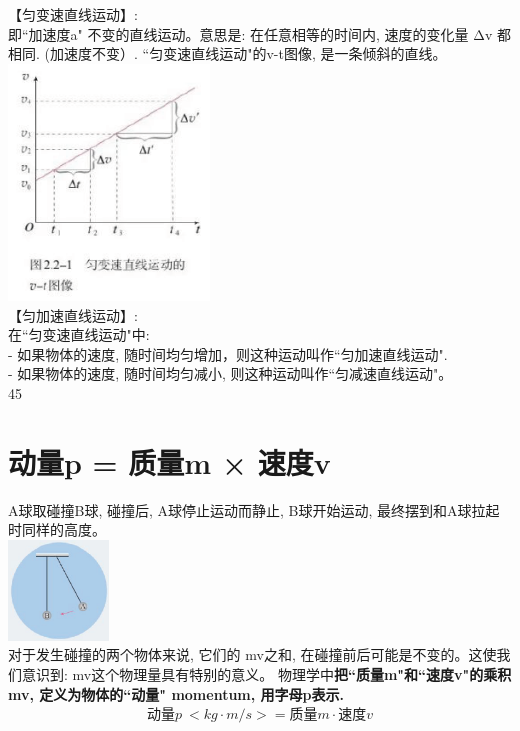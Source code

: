 \documentclass[UTF8]{ctexart}
\begin{document}
【匀变速直线运动】: \\
即``加速度a" 不变的直线运动。意思是: 在任意相等的时间内, 速度的变化量 Δv 都相同. (加速度不变）. ``匀变速直线运动"的v-t图像, 是一条倾斜的直线。\\	
\includegraphics[width=0.4\textwidth]{img/0108.png}	\\
	
	
【匀加速直线运动】:\\
在``匀变速直线运动"中:\\
- 如果物体的速度, 随时间均匀增加，则这种运动叫作``匀加速直线运动". \\
- 如果物体的速度, 随时间均匀减小, 则这种运动叫作``匀减速直线运动"。\\



	
	
	45
	
	
	
	
	
	
	
	
	
		
		
\section{动量p = 质量m × 速度v}

A球取碰撞B球, 碰撞后, A球停止运动而静止, B球开始运动, 最终摆到和A球拉起时同样的高度。 \\
\includegraphics[width=0.2\textwidth]{img/0103.png} \\

对于发生碰撞的两个物体来说, 它们的 mv之和, 在碰撞前后可能是不变的。这使我们意识到: mv这个物理量具有特别的意义。
物理学中\textbf{把``质量m"和``速度v"的乘积mv, 定义为物体的``动量" momentum, 用字母p表示.} 
\begin{align*}
	\boxed{
\text{动量}p\ <kg·m/s>=\text{质量}m\cdot \text{速度}v
	}
\end{align*}
\end{document}
